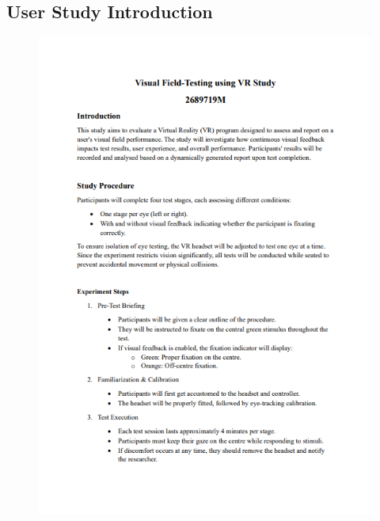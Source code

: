 \documentclass{l4proj}
\begin{document}
\begin{appendices}
\subsection{User Study Introduction}
\begin{figure}
    \centering
    \includegraphics[width=1\linewidth]{images//VFT study/p1.png}
\end{figure}
\clearpage


\end{appendices}
\end{document}
